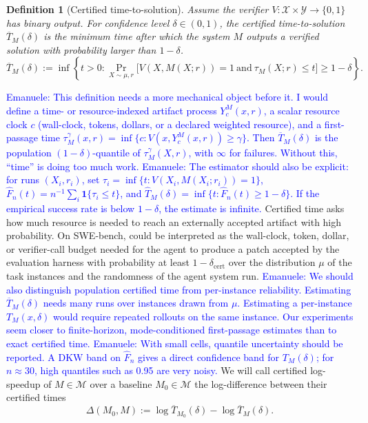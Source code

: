 \documentclass{article}
\newtheorem{definition}{Definition}
\newcommand{\cM}{\mathcal{M}}
\begin{document}
\begin{definition}[Certified time-to-solution]
\label{def:certified-time}
Assume the verifier $V \colon \mathcal{X} \times \mathcal{Y} \to \{0,1\}$ has binary output.
For confidence level \(\delta\in(0,1)\), the certified time-to-solution $\overline T_M(\delta)$ is the minimum time after which the system $M$ outputs a verified solution with probability larger than $1-\delta$.
\[
    \overline T_M(\delta)
    :=
    \inf\left\{
        t>0:
        \Pr_{X\sim\mu,r}
        \big[
            V(X,M(X;r))=1
            \ \mathrm{and}\
            \tau_M(X;r)\le t
        \big]
        \ge 1-\delta
    \right\}.
\]
\end{definition}
\textcolor{blue}{Emanuele: This definition needs a more mechanical object before it. I would define a time- or resource-indexed artifact process \(Y_c^M(x,r)\), a scalar resource clock \(c\) (wall-clock, tokens, dollars, or a declared weighted resource), and a first-passage time \(\tau_M^\gamma(x,r)=\inf\{c:V(x,Y_c^M(x,r))\ge\gamma\}\). Then \(\overline T_M(\delta)\) is the population \((1-\delta)\)-quantile of \(\tau_M^\gamma(X,r)\), with \(\infty\) for failures. Without this, ``time'' is doing too much work.}
\textcolor{blue}{Emanuele: The estimator should also be explicit: for runs \((X_i,r_i)\), set \(\tau_i=\inf\{t:V(X_i,M(X_i;r_i))=1\}\), \(\hat F_n(t)=n^{-1}\sum_i\mathbf 1\{\tau_i\le t\}\), and \(\hat T_M(\delta)=\inf\{t:\hat F_n(t)\ge1-\delta\}\). If the empirical success rate is below \(1-\delta\), the estimate is infinite.}
Certified time asks how much resource is needed to reach an externally accepted artifact with high probability.
On SWE-bench, could be interpreted as the wall-clock, token, dollar, or verifier-call budget needed for the agent to produce a patch accepted by the evaluation harness with probability at least \(1-\delta_{\mathrm{cert}}\) over the distribution $\mu$ of the task instances and the randomness of the agent system run.
\textcolor{blue}{Emanuele: We should also distinguish population certified time from per-instance reliability. Estimating \(\overline T_M(\delta)\) needs many runs over instances drawn from \(\mu\). Estimating a per-instance \(T_M(x,\delta)\) would require repeated rollouts on the same instance. Our experiments seem closer to finite-horizon, mode-conditioned first-passage estimates than to exact certified time.}
\textcolor{blue}{Emanuele: With small cells, quantile uncertainty should be reported. A DKW band on \(\hat F_n\) gives a direct confidence band for \(T_M(\delta)\); for \(n\approx30\), high quantiles such as 0.95 are very noisy.}
We will call certified log-speedup of \(M \in \cM \) over a baseline \(M_0 \in \cM\) the log-difference between their certified times
\[
    \Delta(M_0,M)
    :=
    \log \overline T_{M_0}(\delta)
    -
    \log \overline T_M(\delta).
\]
\end{document}
